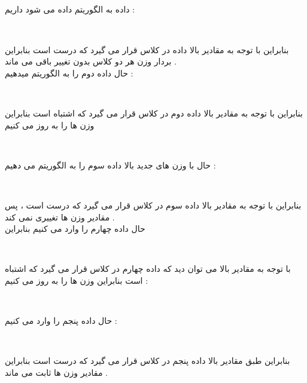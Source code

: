 \documentclass{article}
\begin{document}
\subsection*{}
داده 
به الگوریتم داده می شود  داریم  : 
\begin{center}
	\\
\end{center}
بنابراین با توجه به مقادیر بالا داده 
در کلاس 
قرار می گیرد که درست است بنابراین بردار وزن هر دو کلاس بدون تغییر باقی می ماند  . 
\\
حال داده دوم را به الگوریتم میدهیم  
 : 
 \begin{center}
 	\\
 \end{center}
بنابراین با توجه به مقادیر بالا داده دوم در کلاس 
قرار می گیرد که اشتباه است بنابراین وزن ها را به روز می کنیم 
\begin{center}
	\\
\end{center}
حال با وزن های جدید بالا داده سوم را به الگوریتم می دهیم  
:
\begin{center}
	\\
\end{center}
  بنابراین با توجه به مقادیر بالا داده سوم در کلاس 
  قرار می گیرد که درست است ، پس مقادیر وزن ها تغییری نمی کند  . \\
  حال داده چهارم را وارد می کنیم 
  بنابراین 
  \begin{center}
  	\\
  \end{center}
با توجه به مقادیر بالا می توان دید که داده چهارم در کلاس 
قرار می گیرد که اشتباه است بنابراین وزن ها را به روز می کنیم  : 
\begin{center}
	\\
\end{center}
حال داده پنجم را وارد می کنیم  
:
\begin{center}
	\\
\end{center}
بنابراین طبق مقادیر بالا داده پنجم در کلاس 
قرار می گیرد که درست است بنابراین مقادیر وزن ها ثابت می ماند  . \\
\end{document}
